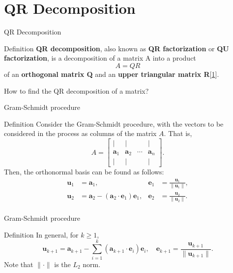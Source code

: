 \documentclass[aspectratio=169, UTF8]{ctexbeamer}
\begin{document}
\section{QR Decomposition}
\begin{frame}[label=3]{QR Decomposition}
    \begin{block}{Definition}
        \textbf{QR decomposition}, also known as \textbf{QR factorization} or \textbf{QU factorization}, is a decomposition of a matrix A into a product 
        \begin{equation*}
            A=QR
        \end{equation*} of an \textbf{orthogonal matrix Q} and an \textbf{upper triangular matrix R}[\href{https://en.wikipedia.org/wiki/QR_decomposition}{1}].
    \end{block}

    \pause
    How to find the QR decomposition of a matrix?
\end{frame}    
    
\begin{frame}{Gram-Schmidt procedure}
    \begin{block}{Definition}
            Consider the Gram-Schmidt procedure, with the vectors to be considered in the process as
    columns of the matrix \(A\). That is,
    \[
    A = \begin{bmatrix}
    \vert & \vert & & \vert \\
    \mathbf{a}_1 & \mathbf{a}_2 & \cdots & \mathbf{a}_n \\
    \vert & \vert & & \vert
    \end{bmatrix}.
    \]
    Then, the orthonormal basis can be found as follows:
    \begin{align*}
    \mathbf{u}_1 &= \mathbf{a}_1, & \mathbf{e}_1 &= \frac{\mathbf{u}_1}{\|\mathbf{u}_1\|}, \\
    \mathbf{u}_2 &= \mathbf{a}_2 - (\mathbf{a}_2 \cdot \mathbf{e}_1)\mathbf{e}_1, & \mathbf{e}_2 &= \frac{\mathbf{u}_2}{\|\mathbf{u}_2\|}. \\
    \end{align*}
    \end{block}
\end{frame}
\begin{frame}{Gram-Schmidt procedure}
    \begin{block}{Definition}
        In general, for \(k \geq 1\),
\[
\mathbf{u}_{k+1} = \mathbf{a}_{k+1} - \sum_{i=1}^k (\mathbf{a}_{k+1} \cdot \mathbf{e}_i)\mathbf{e}_i, \quad \mathbf{e}_{k+1} = \frac{\mathbf{u}_{k+1}}{\|\mathbf{u}_{k+1}\|}.
\]
Note that \(\| \cdot \|\) is the \(L_2\) norm.
    \end{block}
\end{frame}
\end{document}
